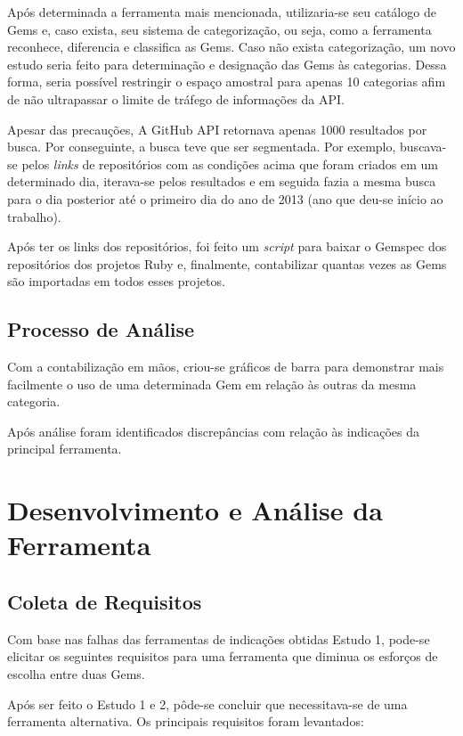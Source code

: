 Após determinada a ferramenta mais mencionada, utilizaria-se seu catálogo de Gems e, caso exista, seu sistema de categorização, ou seja, como a ferramenta reconhece, diferencia e classifica as Gems. Caso não exista categorização, um novo estudo seria feito para determinação e designação das Gems às categorias. Dessa forma, seria possível restringir o espaço amostral para apenas 10 categorias afim de não ultrapassar o limite de tráfego de informações da API.

Apesar das precauções, A GitHub API retornava apenas 1000 resultados por busca. Por conseguinte, a busca teve que ser segmentada. Por exemplo, buscava-se pelos \textit{links} de repositórios com as condições acima que foram criados em um determinado dia, iterava-se pelos resultados e em seguida fazia a mesma busca para o dia posterior até o primeiro dia do ano de 2013 (ano que deu-se início ao trabalho).

Após ter os links dos repositórios, foi feito um \textit{script} para baixar o Gemspec dos repositórios dos projetos Ruby e, finalmente, contabilizar quantas vezes as Gems são importadas em todos esses projetos.

\subsection{Processo de Análise}

Com a contabilização em mãos, criou-se gráficos de barra para demonstrar mais facilmente o uso de uma determinada Gem em relação às outras da mesma categoria.

Após análise foram identificados discrepâncias com relação às indicações da principal ferramenta.

\section{Desenvolvimento e Análise da Ferramenta}

\subsection{Coleta de Requisitos}

Com base nas falhas das ferramentas de indicações obtidas Estudo 1, pode-se
elicitar os seguintes requisitos para uma ferramenta que diminua os esforços de escolha entre duas Gems.

Após ser feito o Estudo 1 e 2, pôde-se concluir que necessitava-se de uma ferramenta alternativa. Os principais requisitos foram levantados:

